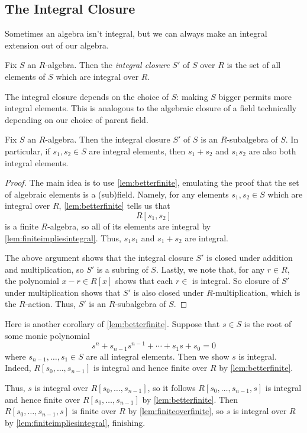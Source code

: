 \subsection{The Integral Closure}
Sometimes an algebra isn't integral, but we can always make an integral extension out of our algebra.
\begin{definition}
	Fix $S$ an $R$-algebra. Then the \textit{integral closure} $S'$ of $S$ over $R$ is the set of all elements of $S$ which are integral over $R$.
\end{definition}
\begin{remark}
	The integral closure depends on the choice of $S$: making $S$ bigger permits more integral elements. This is analogous to the algebraic closure of a field technically depending on our choice of parent field.
\end{remark}
\begin{proposition} \label{prop:integralclosure}
	Fix $S$ an $R$-algebra. Then the integral closure $S'$ of $S$ is an $R$-subalgebra of $S$. In particular, if $s_1,s_2\in S$ are integral elements, then $s_1+s_2$ and $s_1s_2$ are also both integral elements.
\end{proposition}
\begin{proof}
	The main idea is to use \autoref{lem:betterfinite}, emulating the proof that the set of algebraic elements is a (sub)field. Namely, for any elements $s_1,s_2\in S$ which are integral over $R$, \autoref{lem:betterfinite} tells us that
	\[R[s_1,s_2]\]
	is a finite $R$-algebra, so all of its elements are integral by \autoref{lem:finiteimpliesintegral}. Thus, $s_1s_1$ and $s_1+s_2$ are integral.
	
	The above argument shows that the integral closure $S'$ is closed under addition and multiplication, so $S'$ is a subring of $S$. Lastly, we note that, for any $r\in R$, the polynomial $x-r\in R[x]$ shows that each $r\in $ is integral. So closure of $S'$ under multiplication shows that $S'$ is also closed under $R$-multiplication, which is the $R$-action. Thus, $S'$ is an $R$-subalgebra of $S$.
\end{proof}
\begin{remark}[Nir] \label{rem:gettingintclosure}
	Here is another corollary of \autoref{lem:betterfinite}. Suppose that $s\in S$ is the root of some monic polynomial
	\[s^n+s_{n-1}s^{n-1}+\cdots+s_1s+s_0=0\]
	where $s_{n-1},\ldots,s_1\in S$ are all integral elements. Then we show $s$ is integral. Indeed, $R[s_0,\ldots,s_{n-1}]$ is integral and hence finite over $R$ by \autoref{lem:betterfinite}.
	
	Thus, $s$ is integral over $R[s_0,\ldots,s_{n-1}]$, so it follows $R[s_0,\ldots,s_{n-1},s]$ is integral and hence finite over $R[s_0,\ldots,s_{n-1}]$ by \autoref{lem:betterfinite}. Then $R[s_0,\ldots,s_{n-1},s]$ is finite over $R$ by \autoref{lem:finiteoverfinite}, so $s$ is integral over $R$ by \autoref{lem:finiteimpliesintegral}, finishing.
\end{remark}

